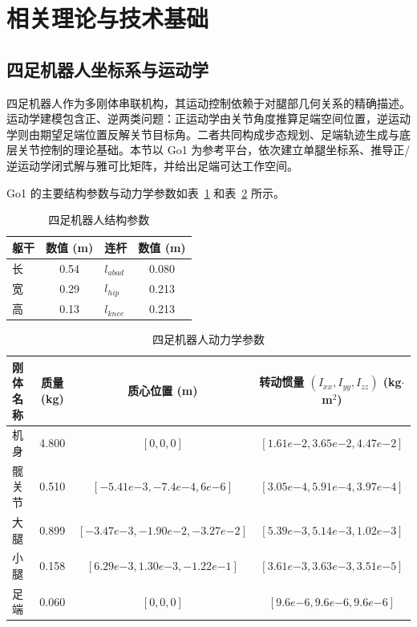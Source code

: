 \documentclass[12pt,a4paper]{ctexart}
\numberwithin{equation}{section}
\numberwithin{table}{section}
\numberwithin{figure}{section}
\newcommand{\subtopic}[1]{\par\addvspace{0.2\baselineskip}\ignorespaces}
\begin{document}
\clearpage
\section{相关理论与技术基础}
\subsection{四足机器人坐标系与运动学}
四足机器人作为多刚体串联机构，其运动控制依赖于对腿部几何关系的精确描述。运动学建模包含正、逆两类问题：正运动学由关节角度推算足端空间位置，逆运动学则由期望足端位置反解关节目标角。二者共同构成步态规划、足端轨迹生成与底层关节控制的理论基础。本节以 Go1 为参考平台，依次建立单腿坐标系、推导正/逆运动学闭式解与雅可比矩阵，并给出足端可达工作空间。

\subtopic{坐标系建立与齐次变换}
Go1 的主要结构参数与动力学参数如表~\ref{tab:go1_structure} 和表~\ref{tab:go1_dynamics} 所示。

\begin{table}[H]
\centering
\caption{四足机器人结构参数}
\label{tab:go1_structure}
\begin{tabular}{lclc}
\toprule
躯干 & 数值 (m) & 连杆 & 数值 (m) \\
\midrule
长 & 0.54 & $l_{abad}$ & 0.080 \\
宽 & 0.29 & $l_{hip}$ & 0.213 \\
高 & 0.13 & $l_{knee}$ & 0.213 \\
\bottomrule
\end{tabular}
\end{table}

\begin{table}[H]
\centering
\caption{四足机器人动力学参数}
\label{tab:go1_dynamics}
\small
\begin{tabular}{lccc}
\toprule
刚体名称 & 质量 (kg) & 质心位置 (m) & 转动惯量 $(I_{xx},I_{yy},I_{zz})$ (kg$\cdot$m$^2$) \\
\midrule
机身 & 4.800 & $[0,0,0]$ & $[1.61e{-2},3.65e{-2},4.47e{-2}]$ \\
髋关节 & 0.510 & $[-5.41e{-3},-7.4e{-4},6e{-6}]$ & $[3.05e{-4},5.91e{-4},3.97e{-4}]$ \\
大腿 & 0.899 & $[-3.47e{-3},-1.90e{-2},-3.27e{-2}]$ & $[5.39e{-3},5.14e{-3},1.02e{-3}]$ \\
小腿 & 0.158 & $[6.29e{-3},1.30e{-3},-1.22e{-1}]$ & $[3.61e{-3},3.63e{-3},3.51e{-5}]$ \\
足端 & 0.060 & $[0,0,0]$ & $[9.6e{-6},9.6e{-6},9.6e{-6}]$ \\
\bottomrule
\end{tabular}
\end{table}
\end{document}
